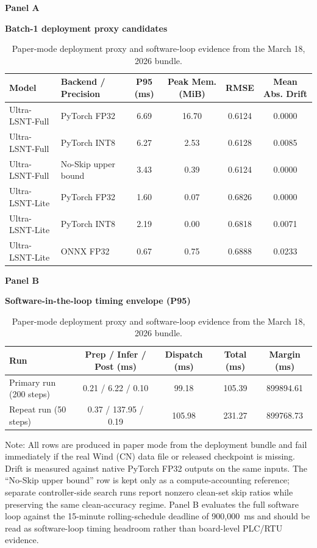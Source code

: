 \documentclass[review,1p,times]{elsarticle}
\newcommand{\aePanelHeading}[2]{%
  \par\vspace{2pt}%
  \noindent\begin{minipage}{\linewidth}
    \centering
    \textbf{#1}\par
    \textbf{#2}\par
  \end{minipage}%
  \par\vspace{2pt}%
}
\newcommand{\aeTableNote}[1]{%
  \par\vspace{2pt}%
  \noindent\begin{minipage}{\linewidth}
    \raggedright\footnotesize
    Note: #1
  \end{minipage}%
  \par
}
\begin{document}
\begin{table}[t]
\centering
\caption{Paper-mode deployment proxy and software-loop evidence from the March 18, 2026 bundle.}
\label{tab:table4_hardware_safety}
\label{tab:main4_hardware_safety_joint}
\label{tab:master_hardware}
\label{tab:matrix_ablation_physics}
\footnotesize
\setlength{\tabcolsep}{4pt}
\aePanelHeading{Panel A}{Batch-1 deployment proxy candidates}
\begin{tabular*}{\linewidth}{@{\extracolsep{\fill}}llcccc@{}}
\toprule
\textbf{Model} & \textbf{Backend / Precision} & \textbf{P95 (ms)} & \textbf{Peak Mem. (MiB)} & \textbf{RMSE} & \textbf{Mean Abs. Drift} \\
\midrule
Ultra-LSNT-Full & PyTorch FP32 & 6.69 & 16.70 & 0.6124 & 0.0000 \\
Ultra-LSNT-Full & PyTorch INT8 & 6.27 & 2.53 & 0.6128 & 0.0085 \\
Ultra-LSNT-Full & No-Skip upper bound & 3.43 & 0.39 & 0.6124 & 0.0000 \\
Ultra-LSNT-Lite & PyTorch FP32 & 1.60 & 0.07 & 0.6826 & 0.0000 \\
Ultra-LSNT-Lite & PyTorch INT8 & 2.19 & 0.00 & 0.6818 & 0.0071 \\
Ultra-LSNT-Lite & ONNX FP32 & 0.67 & 0.75 & 0.6888 & 0.0233 \\
\bottomrule
\end{tabular*}
\vspace{4pt}
\aePanelHeading{Panel B}{Software-in-the-loop timing envelope (P95)}
\begin{tabular*}{0.86\linewidth}{@{\extracolsep{\fill}}lcccc@{}}
\toprule
\textbf{Run} & \textbf{Prep / Infer / Post (ms)} & \textbf{Dispatch (ms)} & \textbf{Total (ms)} & \textbf{Margin (ms)} \\
\midrule
Primary run (200 steps) & 0.21 / 6.22 / 0.10 & 99.18 & 105.39 & 899894.61 \\
Repeat run (50 steps) & 0.37 / 137.95 / 0.19 & 105.98 & 231.27 & 899768.73 \\
\bottomrule
\end{tabular*}
\aeTableNote{All rows are produced in paper mode from the deployment bundle and fail immediately if the real Wind (CN) data file or released checkpoint is missing. Drift is measured against native PyTorch FP32 outputs on the same inputs. The ``No-Skip upper bound'' row is kept only as a compute-accounting reference; separate controller-side search runs report nonzero clean-set skip ratios while preserving the same clean-accuracy regime. Panel B evaluates the full software loop against the 15-minute rolling-schedule deadline of 900{,}000~ms and should be read as software-loop timing headroom rather than board-level PLC/RTU evidence.}
\end{table}
\end{document}
